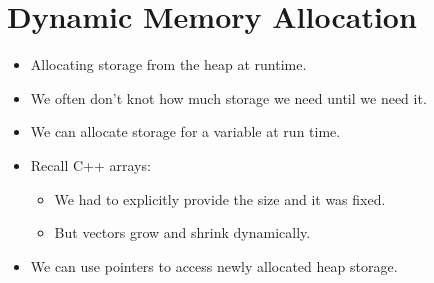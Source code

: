 \section{Dynamic Memory Allocation}
\begin{itemize}
    \item Allocating storage from the heap at runtime.
    \item We often don't knot how much storage we need until we need it.
    \item We can allocate storage for a variable at run time.
    \item Recall C++ arrays:
        \begin{itemize}
            \item We had to explicitly provide the size and it was fixed.
            \item But vectors grow and shrink dynamically.
        \end{itemize}
    
    \item We can use pointers to access newly allocated heap storage.
\end{itemize}

